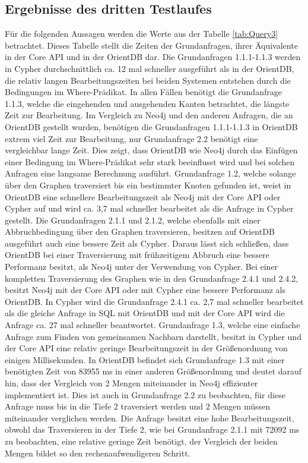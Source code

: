 \subsection{Ergebnisse des dritten Testlaufes}
Für die folgenden Aussagen werden die Werte aus der Tabelle \ref{tab:Query3}  betrachtet. Dieses Tabelle stellt die Zeiten der Grundanfragen, ihrer Äquivalente in der Core API und in der OrientDB dar. \newline
Die Grundanfragen 1.1.1-1.1.3 werden in Cypher durchschnittlich ca. 12 mal schneller ausgeführt als in der OrientDB, die relativ langen Bearbeitungszeiten bei beiden Systemen entstehen durch die Bedingungen im Where-Prädikat. In allen Fällen benötigt die Grundanfrage 1.1.3, welche die eingehenden und ausgehenden Kanten betrachtet, die längste Zeit zur Bearbeitung. Im Vergleich zu Neo4j und den anderen Anfragen, die an OrientDB gestellt wurden, benötigen die Grundanfragen 1.1.1-1.1.3 in OrientDB extrem viel Zeit zur Bearbeitung, nur Grundanfrage 2.2 benötigt eine vergleichbar lange Zeit. Dies zeigt, dass OrientDB wie Neo4j durch das Einfügen einer Bedingung im Where-Prädikat sehr stark beeinflusst wird und bei solchen Anfragen eine langsame Berechnung ausführt. \newline
 Grundanfrage 1.2, welche solange über den Graphen traversiert bis ein bestimmter Knoten gefunden ist, weist in OrientDB eine schnellere Bearbeitungszeit als Neo4j mit der Core API oder Cypher auf und wird ca. 3,7 mal schneller bearbeitet als die Anfrage in Cypher gestellt. Die Grundanfragen 2.1.1 und 2.1.2, welche ebenfalls mit einer Abbruchbedingung über den Graphen traversieren, besitzen auf OrientDB ausgeführt auch eine bessere Zeit als Cypher. Daraus lässt sich schließen, dass OrientDB  bei einer Traversierung mit frühzeitigem Abbruch eine bessere Performanz besitzt, als Neo4j unter der Verwendung von Cypher. Bei einer kompletten Traversierung des Graphen wie in den Grundanfrage 2.4.1 und 2.4.2, besitzt Neo4j mit der Core API oder mit Cypher eine bessere Performanz als OrientDB. In Cypher wird die Grundanfrage 2.4.1 ca. 2,7 mal schneller bearbeitet als die gleiche Anfrage in SQL mit OrientDB und mit der Core API wird die Anfrage ca. 27 mal schneller beantwortet. \newline
Grundanfrage 1.3, welche eine einfache Anfrage zum Finden von gemeinsamen Nachbarn darstellt, besitzt in Cypher und der Core API eine relativ geringe Bearbeitungszeit in der Größenordnung von einigen Millisekunden. In OrientDB befindet sich Grundanfrage 1.3 mit einer benötigten Zeit von 83955 ms in einer anderen Größenordnung und deutet darauf hin, dass der Vergleich von 2 Mengen miteinander in Neo4j effizienter implementiert ist. Dies ist auch in Grundanfrage 2.2 zu beobachten, für diese Anfrage muss bis in die Tiefe 2 traversiert werden und 2 Mengen müssen miteinander verglichen werden. Die Anfrage besitzt eine hohe Bearbeitungszeit, obwohl das Traversieren in der Tiefe 2, wie bei Grundanfrage 2.1.1 mit 72092 ms zu beobachten, eine relative geringe Zeit benötigt, der Vergleich der beiden Mengen bildet so den rechenaufwendigeren Schritt. \newline
